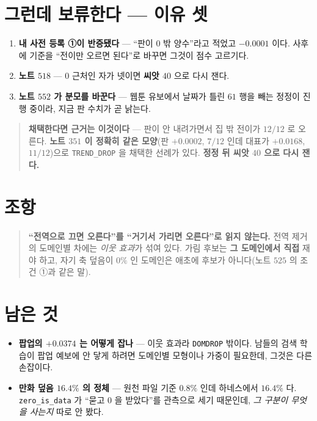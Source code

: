 \documentclass[11pt]{article}
\begin{document}
\section*{그런데 보류한다 --- 이유 셋}

\begin{enumerate}
\item \textbf{내 사전 등록 ①이 반증됐다} --- ``판이 $0$ 밖 양수''라고 적었고
$-0.0001$ 이다. 사후에 기준을 ``전이만 오르면 된다''로 바꾸면 그것이 점수
고르기다.
\item \textbf{노트 $518$} --- $0$ 근처인 자가 넷이면 \textbf{씨앗 $40$} 으로
다시 잰다.
\item \textbf{노트 $552$ 가 분모를 바꾼다} --- 웹툰 유보에서 날짜가 틀린
$61$ 행을 빼는 정정이 진행 중이라, 지금 판 수치가 곧 낡는다.
\end{enumerate}

\begin{quote}
\textbf{채택한다면 근거는 이것이다} --- 판이 안 내려가면서 집 밖 전이가
$12/12$ 로 오른다. \textbf{노트 $351$ 이 정확히 같은 모양}(판 $+0.0002$,
$7/12$ 인데 대표가 $+0.0168$, $11/12$)으로 \texttt{TREND\_DROP} 을
채택한 선례가 있다. \textbf{정정 뒤 씨앗 $40$ 으로 다시 잰다.}
\end{quote}

\section*{조항}

\begin{quote}
\textbf{``전역으로 끄면 오른다''를 ``거기서 가리면 오른다''로 읽지 않는다.}
전역 제거의 도메인별 차에는 \emph{이웃 효과}가 섞여 있다. 가림 후보는
\textbf{그 도메인에서 직접} 재야 하고, 자기 축 덮음이 $0\%$ 인 도메인은
애초에 후보가 아니다(노트 $525$ 의 조건 ①과 같은 말).
\end{quote}

\section*{남은 것}

\begin{itemize}
\item \textbf{팝업의 $+0.0374$ 는 어떻게 잡나} --- 이웃 효과라
\texttt{DOMDROP} 밖이다. 남들의 검색 학습이 팝업 예보에 안 닿게 하려면
도메인별 모형이나 가중이 필요한데, 그것은 다른 손잡이다.
\item \textbf{만화 덮음 $16.4\%$ 의 정체} --- 원천 파일 기준 $0.8\%$ 인데
하네스에서 $16.4\%$ 다. \texttt{zero\_is\_data} 가 ``묻고 $0$ 을 받았다''를
관측으로 세기 때문인데, \emph{그 구분이 무엇을 사는지} 따로 안 봤다.
\end{itemize}
\end{document}
